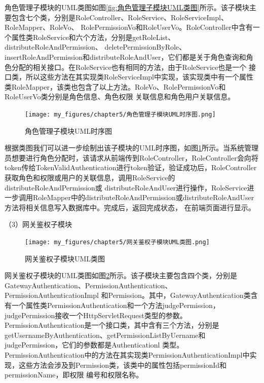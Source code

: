 角色管理子模块的UML类图如图\ref{fig:角色管理子模块UML类图}所示。该子模块主要包含七个类，分别是RoleController、RoleService、RoleServiceImpl、RoleMapper、RoleVo、
RolePermissionVo和RoleUserVo。RoleController中含有一个属性类RoleService和六个方法，分别是getRoleList、distributeRoleAndPermission、
deletePermissionByRole、insertRoleAndPermission和distributeRoleAndUser，它们都是关于角色查询和角色分配的相关接口。在RoleService也有相同的方法，由于RoleService也是一个
接口类，所以这些方法在其实现类RoleServiceImpl中实现，该实现类中有一个属性类RoleMapper，该类也包含了以上方法。RoleVo、RolePermissionVo和RoleUserVo类分别是角色信息、角色权限
关联信息和角色用户关联信息。

\begin{figure}[htb]
    \centering
    \texttt{[image: my\_figures/chapter5/角色管理子模块UML时序图.png]}
    \caption{角色管理子模块UML时序图}
    \label{fig:角色管理子模块UML时序图}
\end{figure}

根据类图我们可以进一步绘制出该子模块的UML时序图，如图\ref{fig:角色管理子模块UML时序图}所示。当系统管理员想要进行角色分配时，该请求从前端传到RoleController，RoleController会向将
token传给TokenValidAuthentication进行token验证，验证成功后，RoleController获取角色和权限或用户的关联信息，调用RoleService的distributeRoleAndPermission或
distributeRoleAndUser进行操作，RoleService进一步调用RoleMapper中的distributeRoleAndPermission或distributeRoleAndUser方法将相关信息写入数据库中。完成后，返回完成状态，
在前端页面进行显示。


（3）网关鉴权子模块

\begin{figure}[htb]
    \centering
    \texttt{[image: my\_figures/chapter5/网关鉴权子模块UML类图.png]}
    \caption{网关鉴权子模块UML类图}
    \label{fig:网关鉴权子模块UML类图}
\end{figure}

网关鉴权子模块的UML类图如图\ref{fig:网关鉴权子模块UML类图}所示。该子模块主要包含四个类，分别是GatewayAuthentication、PermissionAuthentication、PermissionAuthenticationImpl
和Permission。其中，GatewayAuthentication类含有一个属性类PermissionAuthentication和一个方法judgePermission，judgePermission接收一个HttpServletRequest类型的参数。
PermissionAuthentication是一个接口类，其中含有三个方法，分别是getUsernameByAuthentication、getPermissionListByUername和judgePermission，它们的参数都是Authenticationl
类型。PermissionAuthentication中的方法在其实现类PermissionAuthenticationImpl中实现，这些方法会涉及到Permission类，该类中的属性包括permissionId和permissionName，即权限
编号和权限名称。

